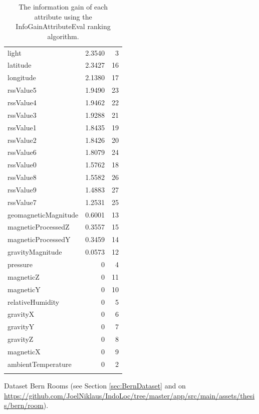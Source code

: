 \begin{table}[H]
	\begin{threeparttable}
		\caption{The information gain of each attribute using the InfoGainAttributeEval ranking algorithm.}
		\label{tab:InfoGain}
		\centering
		\begin{tabular}{l r r}
		\toprule
		\tabhead{Attribute Name} & \tabhead{Information Gain} & \tabhead{Attribute Index} \\
		\midrule
light & 2.3540   &  3 \\
latitude & 2.3427  & 16 \\
longitude & 2.1380   & 17 \\
rssValue5 & 1.9490   & 23 \\
rssValue4 & 1.9462  & 22 \\
rssValue3 & 1.9288  & 21 \\
rssValue1 & 1.8435  & 19 \\
rssValue2 & 1.8426  & 20 \\
rssValue6 & 1.8079  & 24 \\
rssValue0 & 1.5762  & 18 \\
rssValue8 & 1.5582  & 26 \\
rssValue9 & 1.4883  & 27 \\
rssValue7 & 1.2531  & 25 \\
geomagneticMagnitude & 0.6001  & 13 \\
magneticProcessedZ & 0.3557  & 15 \\
magneticProcessedY & 0.3459  & 14 \\
gravityMagnitude & 0.0573  & 12 \\
pressure & 0       &  4 \\
magneticZ & 0       & 11 \\
magneticY & 0       & 10 \\
relativeHumidity & 0       &  5 \\
gravityX & 0       &  6 \\
gravityY & 0       &  7 \\
gravityZ & 0       &  8 \\
magneticX & 0       &  9 \\
ambientTemperature & 0       &  2 \\
			\bottomrule\\
		\end{tabular}
		\begin{tablenotes}
      \small
      \item Dataset Bern Rooms (see Section \ref{sec:BernDataset} and on \url{https://github.com/JoelNiklaus/IndoLoc/tree/master/app/src/main/assets/thesis/bern/room}).
    \end{tablenotes}
	\end{threeparttable}
\end{table}


